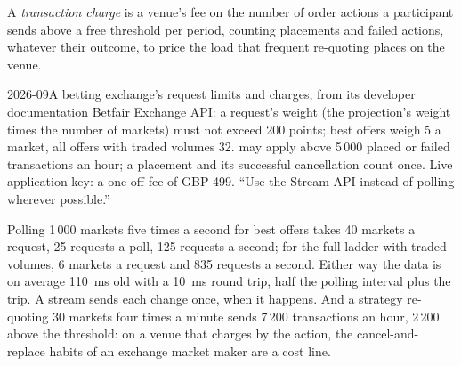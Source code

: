 \begin{definition}\label{def:nw:power-commodities-and-betting-connectivity:txn}
A \emph{transaction charge} is a venue's fee on the number of order actions a participant sends above a
free threshold per period, counting placements and failed actions, whatever their outcome, to price the load that frequent
re-quoting places on the venue.
\end{definition}

\begin{dated}{2026-09}{A betting exchange's request limits and charges, from its developer documentation}\label{dat:nw:power-commodities-and-betting-connectivity:betfair}
Betfair Exchange API: a request's weight (the projection's weight times the number of markets) must not exceed 200 points; best offers
weigh 5 a market, all offers with traded volumes 32.  may apply above 5\,000 placed or failed transactions an hour;
a placement and its successful cancellation count once. Live application key: a one-off fee of GBP 499. ``Use the Stream API instead
of polling wherever possible.''
\end{dated}

\label{lst:nw:power-commodities-and-betting-connectivity:poll}

Polling 1\,000 markets five times a second for best offers takes 40 markets a request, 25 requests a poll, 125 requests a second; for
the full ladder with traded volumes, 6 markets a request and 835 requests a second. Either way the data is on average
\qty{110}{\milli\second} old with a \qty{10}{\milli\second} round trip, half the polling interval plus the trip. A stream sends each
change once, when it happens. And a strategy re-quoting 30 markets four times a minute sends 7\,200 transactions an hour, 2\,200 above
the threshold: on a venue that charges by the action, the cancel-and-replace habits of an exchange market maker are a cost line.

